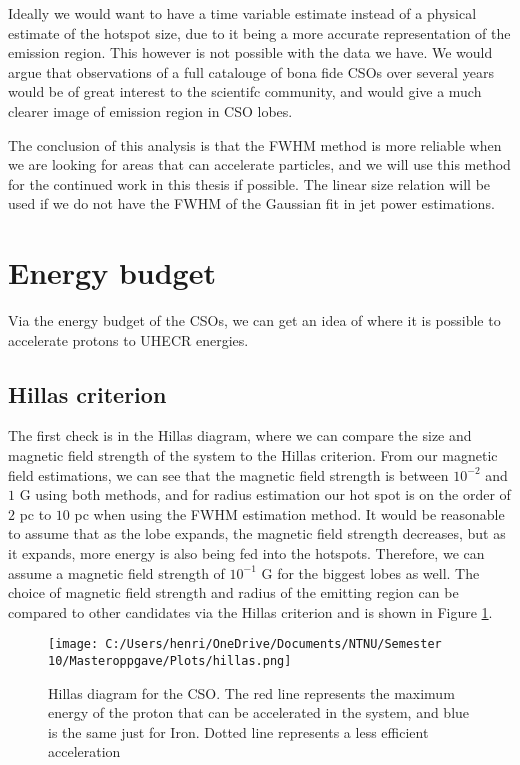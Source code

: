 Ideally we would want to have a time variable estimate instead of a physical estimate of the hotspot size, due to it being a more accurate representation of the emission region. This however is not possible with the data we have. We would argue that observations of a full catalouge of bona fide CSOs over several years would be of great interest to the scientifc community, and would give a much clearer image of emission region in CSO lobes. 

The conclusion of this analysis is that the FWHM method is more reliable when we are looking for areas that can accelerate particles, and we will use this method for the continued work in this thesis if possible. The linear size relation will be used if we do not have the FWHM of the Gaussian fit in jet power estimations.

\section{Energy budget}
Via the energy budget of the CSOs, we can get an idea of where it is possible to accelerate protons to UHECR energies.

\subsection{Hillas criterion}

 The first check is in the Hillas diagram, where we can compare the size and magnetic field strength of the system to the Hillas criterion. From our magnetic field estimations, we can see that the magnetic field strength is between $10^{-2}$ and $1$ G using both methods, and for radius estimation our hot spot is on the order of $2$ pc to $10$ pc when using the FWHM estimation method. It would be reasonable to assume that as the lobe expands, the magnetic field strength decreases, but as it expands, more energy is also being fed into the hotspots. Therefore, we can assume a magnetic field strength of $10^{-1}$ G for the biggest lobes as well. The choice of magnetic field strength and radius of the emitting region can be compared to other candidates via the Hillas criterion and is shown in Figure \ref{fig:Hillas}.


\begin{figure}
    \centering
    \texttt{[image: C:/Users/henri/OneDrive/Documents/NTNU/Semester 10/Masteroppgave/Plots/hillas.png]}
    \caption{Hillas diagram for the CSO. The red line represents the maximum energy of the proton that can be accelerated in the system, and blue is the same just for Iron. Dotted line represents a less efficient acceleration }
    \label{fig:Hillas}
\end{figure}

